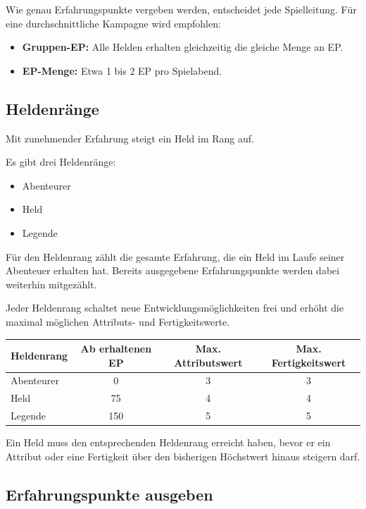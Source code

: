 Wie genau Erfahrungspunkte vergeben werden, entscheidet jede Spielleitung. Für eine durchschnittliche Kampagne wird empfohlen:

\begin{itemize}
  \item \textbf{Gruppen-EP:} Alle Helden erhalten gleichzeitig die gleiche Menge an EP.
  \item \textbf{EP-Menge:} Etwa 1 bis 2 EP pro Spielabend.
\end{itemize}

\subsection{Heldenränge}

Mit zunehmender Erfahrung steigt ein Held im Rang auf.

Es gibt drei Heldenränge:

\begin{itemize}
  \item Abenteurer
  \item Held
  \item Legende
\end{itemize}

Für den Heldenrang zählt die gesamte Erfahrung, die ein Held im Laufe seiner Abenteuer erhalten hat. Bereits ausgegebene Erfahrungspunkte werden dabei weiterhin mitgezählt.

Jeder Heldenrang schaltet neue Entwicklungsmöglichkeiten frei und erhöht die maximal möglichen Attributs- und Fertigkeitswerte.

\begin{center}
\begin{tabular}{lccc}
\textbf{Heldenrang} & \textbf{Ab erhaltenen EP} & \textbf{Max. Attributswert} & \textbf{Max. Fertigkeitswert} \\
\hline
Abenteurer & 0 & 3 & 3 \\
Held & 75 & 4 & 4 \\
Legende & 150 & 5 & 5 \\
\end{tabular}
\end{center}

Ein Held muss den entsprechenden Heldenrang erreicht haben, bevor er ein Attribut oder eine Fertigkeit über den bisherigen Höchstwert hinaus steigern darf.

\subsection{Erfahrungspunkte ausgeben}

